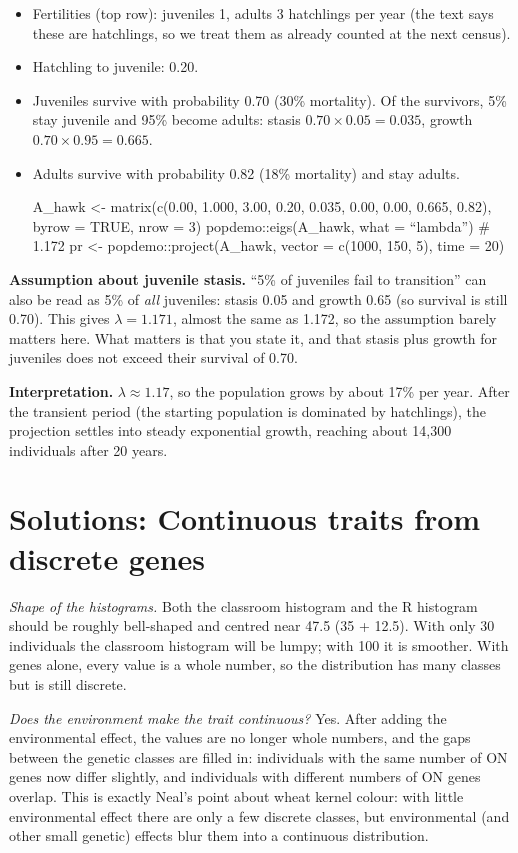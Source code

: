 \documentclass[
  a4paper]{book}
\begin{document}
\begin{itemize}
\item
  Fertilities (top row): juveniles 1, adults 3 hatchlings per year (the text says these are hatchlings, so we treat them as already counted at the next census).
\item
  Hatchling to juvenile: 0.20.
\item
  Juveniles survive with probability 0.70 (30\% mortality). Of the survivors, 5\% stay juvenile and 95\% become adults: stasis \(0.70 \times 0.05 = 0.035\), growth \(0.70 \times 0.95 = 0.665\).
\item
  Adults survive with probability 0.82 (18\% mortality) and stay adults.

  A\_hawk \textless- matrix(c(0.00, 1.000, 3.00,
  0.20, 0.035, 0.00,
  0.00, 0.665, 0.82),
  byrow = TRUE, nrow = 3)
  popdemo::eigs(A\_hawk, what = ``lambda'') \# 1.172
  pr \textless- popdemo::project(A\_hawk, vector = c(1000, 150, 5), time = 20)
\end{itemize}

\textbf{Assumption about juvenile stasis.} ``5\% of juveniles fail to transition'' can also be read as 5\% of \emph{all} juveniles: stasis 0.05 and growth 0.65 (so survival is still 0.70). This gives \(\lambda = 1.171\), almost the same as 1.172, so the assumption barely matters here. What matters is that you state it, and that stasis plus growth for juveniles does not exceed their survival of 0.70.

\textbf{Interpretation.} \(\lambda \approx 1.17\), so the population grows by about 17\% per year. After the transient period (the starting population is dominated by hatchlings), the projection settles into steady exponential growth, reaching about 14,300 individuals after 20 years.

\section{Solutions: Continuous traits from discrete genes}\label{solutions-continuous-traits-from-discrete-genes}

\emph{Shape of the histograms.} Both the classroom histogram and the R histogram should be roughly bell-shaped and centred near 47.5 (35 + 12.5). With only 30 individuals the classroom histogram will be lumpy; with 100 it is smoother. With genes alone, every value is a whole number, so the distribution has many classes but is still discrete.

\emph{Does the environment make the trait continuous?} Yes. After adding the environmental effect, the values are no longer whole numbers, and the gaps between the genetic classes are filled in: individuals with the same number of ON genes now differ slightly, and individuals with different numbers of ON genes overlap. This is exactly Neal's point about wheat kernel colour: with little environmental effect there are only a few discrete classes, but environmental (and other small genetic) effects blur them into a continuous distribution.
\end{document}
